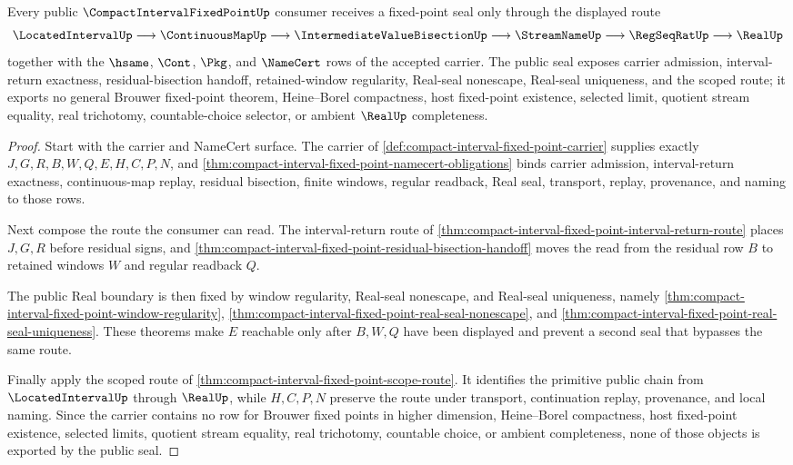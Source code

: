 \begin{theorem}
\label{thm:compact-interval-fixed-point-public-seal}
Every public $\CompactIntervalFixedPointUp$ consumer receives a fixed-point seal only through the displayed route
$$
\LocatedIntervalUp\longrightarrow\ContinuousMapUp\longrightarrow\IntermediateValueBisectionUp\longrightarrow\StreamNameUp\longrightarrow\RegSeqRatUp\longrightarrow\RealUp
$$
together with the $\hsame$, $\Cont$, $\Pkg$, and $\NameCert$ rows of the accepted carrier. The public seal exposes carrier admission, interval-return exactness, residual-bisection handoff, retained-window regularity, Real-seal nonescape, Real-seal uniqueness, and the scoped route; it exports no general Brouwer fixed-point theorem, Heine--Borel compactness, host fixed-point existence, selected limit, quotient stream equality, real trichotomy, countable-choice selector, or ambient $\RealUp$ completeness.
\end{theorem}
\begin{proof}
Start with the carrier and NameCert surface. The carrier of \autoref{def:compact-interval-fixed-point-carrier} supplies exactly $J,G,R,B,W,Q,E,H,C,P,N$, and \autoref{thm:compact-interval-fixed-point-namecert-obligations} binds carrier admission, interval-return exactness, continuous-map replay, residual bisection, finite windows, regular readback, Real seal, transport, replay, provenance, and naming to those rows.

Next compose the route the consumer can read. The interval-return route of \autoref{thm:compact-interval-fixed-point-interval-return-route} places $J,G,R$ before residual signs, and \autoref{thm:compact-interval-fixed-point-residual-bisection-handoff} moves the read from the residual row $B$ to retained windows $W$ and regular readback $Q$.

The public Real boundary is then fixed by window regularity, Real-seal nonescape, and Real-seal uniqueness, namely \autoref{thm:compact-interval-fixed-point-window-regularity}, \autoref{thm:compact-interval-fixed-point-real-seal-nonescape}, and \autoref{thm:compact-interval-fixed-point-real-seal-uniqueness}. These theorems make $E$ reachable only after $B,W,Q$ have been displayed and prevent a second seal that bypasses the same route.

Finally apply the scoped route of \autoref{thm:compact-interval-fixed-point-scope-route}. It identifies the primitive public chain from $\LocatedIntervalUp$ through $\RealUp$, while $H,C,P,N$ preserve the route under transport, continuation replay, provenance, and local naming. Since the carrier contains no row for Brouwer fixed points in higher dimension, Heine--Borel compactness, host fixed-point existence, selected limits, quotient stream equality, real trichotomy, countable choice, or ambient completeness, none of those objects is exported by the public seal.
\end{proof}

